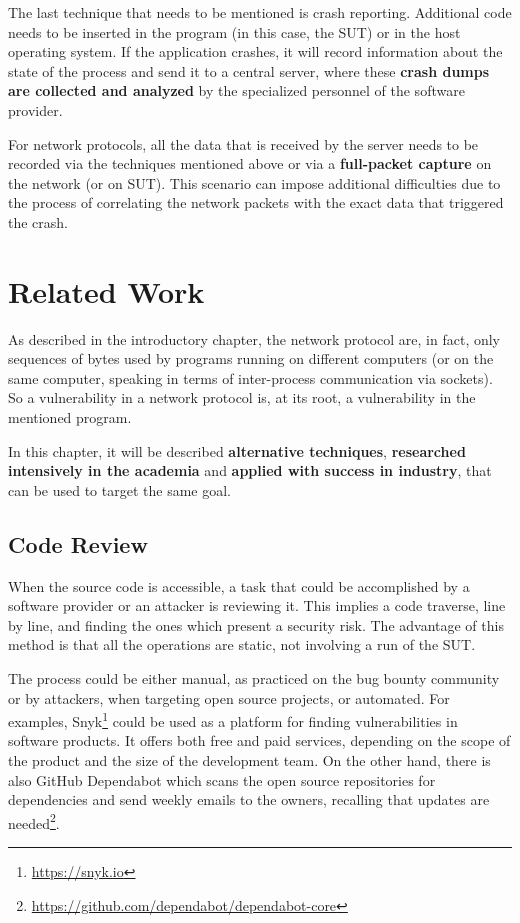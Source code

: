 \documentclass[10pt,a4paper,english,onecolumn]{IEEEtran}
\begin{document}
The last technique that needs to be mentioned is crash reporting. Additional code needs to be inserted in the program (in this case, the SUT) or in the host operating system. If the application crashes, it will record information about the state of the process and send it to a central server, where these \textbf{crash dumps are collected and analyzed} by the specialized personnel of the software provider.

For network protocols, all the data that is received by the server needs to be recorded via the techniques mentioned above or via a \textbf{full-packet capture} on the network (or on SUT). This scenario can impose additional difficulties due to the process of correlating the network packets with the exact data that triggered the crash.

\section{Related Work}

As described in the introductory chapter, the network protocol are, in fact, only sequences of bytes used by programs running on different computers (or on the same computer, speaking in terms of inter-process communication via sockets). So a vulnerability in a network protocol is, at its root, a vulnerability in the mentioned program.

In this chapter, it will be described \textbf{alternative techniques}, \textbf{researched intensively in the academia} and \textbf{applied with success in industry}, that can be used to target the same goal.

\subsection{Code Review}

When the source code is accessible, a task that could be accomplished by a software provider or an attacker is reviewing it. This implies a code traverse, line by line, and finding the ones which present a security risk. The advantage of this method is that all the operations are static, not involving a run of the SUT.

The process could be either manual, as practiced on the bug bounty community or by attackers, when targeting open source projects, or automated. For examples, Snyk\footnote{\href{https://snyk.io}{https://snyk.io}} could be used as a platform for finding vulnerabilities in software products. It offers both free and paid services, depending on the scope of the product and the size of the development team. On the other hand, there is also GitHub Dependabot which scans the open source repositories for dependencies and send weekly emails to the owners, recalling that updates are needed\footnote{\href{https://github.com/dependabot/dependabot-core}{https://github.com/dependabot/dependabot-core}}.
\end{document}
